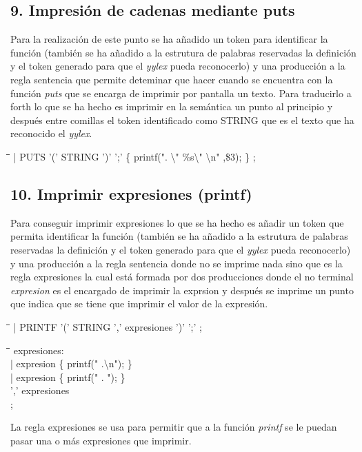 \documentclass[11pt,spanish]{article}
\begin{document}
		\subsection*{9. Impresión de cadenas mediante puts}
		Para la realización de este punto se ha añadido un token para identificar la función (también se ha añadido a la estrutura de palabras reservadas la definición y el token generado para que el \textit {yylex} pueda reconocerlo) y una producción a la regla {\ttfamily sentencia} que permite deteminar que hacer cuando se encuentra con la función \textit {puts} que se encarga de imprimir por pantalla un texto. Para traducirlo a forth lo que se ha hecho es imprimir en la semántica un punto al principio y después entre comillas el token identificado como STRING que es el texto que ha reconocido el \textit {yylex}.
		\begin{tabbing}
            \hspace*{1cm}\=\hspace*{1cm}\= \hspace*{4cm}\=\kill
            \>| PUTS '(' STRING ')' ';'\> \>		\{ printf(". \textbackslash "  \%s\textbackslash " \textbackslash n" ,\$3); \}
            ;
		\end{tabbing}
		\subsection*{10. Imprimir expresiones (printf)}
		Para conseguir imprimir expresiones lo que se ha hecho es añadir un token que permita identificar la función (también se ha añadido a la estrutura de palabras reservadas la definición y el token generado para que el \textit {yylex} pueda reconocerlo) y una producción a la regla {\ttfamily sentencia} donde no se imprime nada sino que es la regla {\ttfamily expresiones} la cual está formada por dos producciones donde el no terminal \textit {expresion} es el encargado de imprimir la exprsion y después se imprime un punto que indica que se tiene que imprimir el valor de la expresión.
		\begin{tabbing}
            \hspace*{1cm}\=\hspace*{1cm}\= \hspace*{4cm}\=\kill
            | PRINTF '(' STRING ',' expresiones ')' ';'
            ;
		\end{tabbing}
		\begin{tabbing}
            \hspace*{1cm}\=\hspace*{1cm}\= \hspace*{6cm}\=\kill
            expresiones:\\
					\>| expresion\> \> \{ printf(" .\textbackslash n"); \}\\
					\>| expresion\> \> \{ printf(" . "); \}\\
					\>',' expresiones\\
			;
		\end{tabbing}
		La regla {\ttfamily expresiones} se usa para permitir que a la función \textit {printf} se le puedan pasar una o más expresiones que imprimir.
\end{document}
